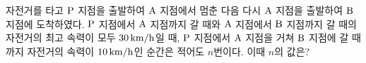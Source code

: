 자전거를 타고 $\mathrm{P}$ 지점을 출발하여 $\mathrm{A}$ 지점에서 멈춘 다음 다시 $\mathrm{A}$ 지점을 출발하여 $\mathrm{B}$ 지점에 도착하였다. $\mathrm{P}$ 지점에서 $\mathrm{A}$ 지점까지 갈 때와 $\mathrm{A}$ 지점에서 $\mathrm{B}$ 지점까지 갈 때의 자전거의 최고 속력이 모두 $30\mkern3mu \mathrm{km/h}$일 때, $\mathrm{P}$ 지점에서 $\mathrm{A}$ 지점을 거쳐 $\mathrm{B}$ 지점에 갈 때까지 자전거의 속력이 $10\mkern3mu \mathrm{km/h}$인 순간은 적어도 $n$번이다. 이때 $n$의 값은?

